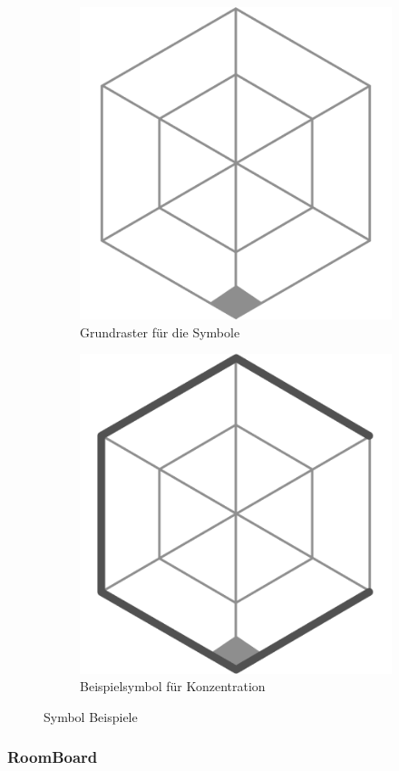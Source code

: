\documentclass{article}
\begin{document}
\begin{figure}[h]
\centering
\begin{subfigure}{.4\textwidth}
  \centering
  \includegraphics[width=.7\linewidth]{images/sigil-base.png}
  \caption{Grundraster für die Symbole}
  \label{fig:sub1}
\end{subfigure}
\begin{subfigure}{.4\textwidth}
  \centering
  \includegraphics[width=.7\linewidth]{images/sigil-example.png}
  \caption{Beispielsymbol für Konzentration}
  \label{fig:sub2}
\end{subfigure}
\caption{Symbol Beispiele}
\label{fig:test}
\end{figure}


\subsubsection*{RoomBoard} 
\end{document}
